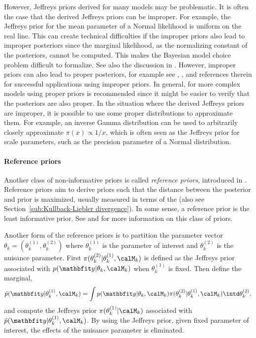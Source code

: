 However, Jeffreys priors derived for many models may be problematic. It is often the case that the derived Jeffreys priors can be improper. For example, the Jeffreys prior for the mean parameter of a Normal likelihood is uniform on the real line. This can create technical difficulties if the improper priors also lead to improper posteriors since the marginal likelihood, as the normalizing constant of the posteriors, cannot be computed. This makes the Bayesian model choice problem difficult to formalize. See also the discussion in \cite{Kass:1995vb}. However, improper priors can also lead to proper posteriors, for example see \cite[][sec.~2.9]{Gelman:2003vx}, \cite[][sec.~1.5]{Robert:2007tc}, \cite{Kass:1995vb} and references therein for successful applications using improper priors. In general, for more complex models using proper priors is recommended since it might be easier to verify that the posteriors are also proper. In the situation where the derived Jeffreys priors are improper, it is possible to use some proper distributions to approximate them. For example, an inverse Gamma distribution can be used to arbitrarily closely approximate $\pi(x)\propto1/x$, which is often seen as the Jeffreys prior for scale parameters, such as the precision parameter of a Normal distribution.

\paragraph{Reference priors}

Another class of non-informative priors is called \emph{reference priors}, introduced in \cite{Bernardo:1979uq}. Reference priors aim to derive priors such that the distance between the posterior and prior is maximized, usually measured in terms of the \kldfull \cite{Kullback:1951va} (also see Section~\ref{sub:Kullback-Liebler divergence}). In some sense, a reference prior is the least informative prior. See \cite{Berger:1989vj, Berger:1992kf, Berger:1992wo} and \cite[][sec.~5.4]{Bernardo:1994vd} for more information on this class of priors.

Another form of the reference priors is to partition the parameter vector $\theta_k = (\theta_k^{(1)},\theta_k^{(2)})$ where $\theta_k^{(1)}$ is the parameter of interest and $\theta_k^{(2)}$ is the nuisance parameter. First $\pi(\theta_k^{(2)}|\theta_k^{(1)},\calM_k)$ is defined as the Jeffreys prior associated with $p(\data|\theta_k,\calM_k)$ when $\theta_k^{(1)}$ is fixed. Then define the marginal,
\begin{equation}
  \tilde{p}(\data|\theta_k^{(1)},\calM_k) =
  \int p(\data|\theta_k,\calM_k)\pi(\theta_k^{(2)}|\theta_k^{(1)},\calM_k)
  \intd \theta_k^{(2)},
\end{equation}
and compute the Jeffreys prior $\pi(\theta_k^{(1)}|\calM_k)$ associated with $\tilde{p}(\data|\theta_k^{(1)},\calM_k)$. By using the Jeffreys prior, given fixed parameter of interest, the effects of the nuisance parameter is eliminated.

